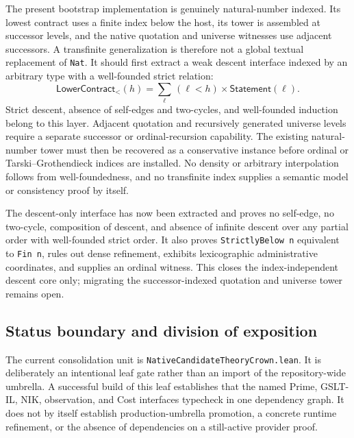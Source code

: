 \documentclass[11pt]{article}
\newcommand{\code}[1]{\texttt{#1}}
\begin{document}
The present bootstrap implementation is genuinely natural-number indexed.  Its
lowest contract uses a finite index below the host, its tower is assembled at
successor levels, and the native quotation and universe witnesses use adjacent
successors.  A transfinite generalization is therefore not a global textual
replacement of \code{Nat}.  It should first extract a weak descent interface
indexed by an arbitrary type with a well-founded strict relation:
\[
  \mathsf{LowerContract}_{<}(h)
    = \sum_{\ell}\,(\ell<h)\times\mathsf{Statement}(\ell).
\]
Strict descent, absence of self-edges and two-cycles, and well-founded induction
belong to this layer.  Adjacent quotation and recursively generated universe
levels require a separate successor or ordinal-recursion capability.  The
existing natural-number tower must then be recovered as a conservative instance
before ordinal or Tarski--Grothendieck indices are installed.  No density or
arbitrary interpolation follows from well-foundedness, and no transfinite index
supplies a semantic model or consistency proof by itself.

The descent-only interface has now been extracted and proves no self-edge, no
two-cycle, composition of descent, and absence of infinite descent over any
partial order with well-founded strict order.  It also proves
\code{StrictlyBelow n} equivalent to \code{Fin n}, rules out dense refinement,
exhibits lexicographic administrative coordinates, and supplies an ordinal
witness.  This closes the index-independent descent core only; migrating the
successor-indexed quotation and universe tower remains open.

\subsection{Status boundary and division of exposition}

The current consolidation unit is
\code{NativeCandidateTheoryCrown.lean}.  It is deliberately an intentional leaf
gate rather than an import of the repository-wide umbrella.  A successful
build of this leaf establishes that the named Prime, GSLT-IL, NIK, observation,
and Cost interfaces typecheck in one dependency graph.  It does not by itself
establish production-umbrella promotion, a concrete runtime refinement, or the
absence of dependencies on a still-active provider proof.
\end{document}
